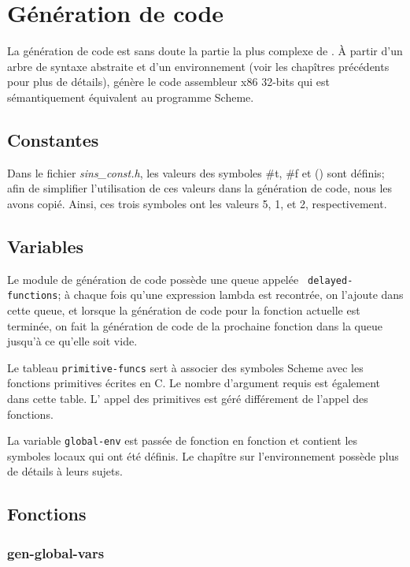 \documentclass[11pt]{report}
\begin{document}
\chapter{Génération de code}

La génération de code est sans doute la partie la plus complexe de
\sins{}.  À partir d'un arbre de syntaxe abstraite et d'un
environnement (voir les chapîtres précédents pour plus de détails),
\sins{} génère le code assembleur x86 32-bits qui est sémantiquement
équivalent au programme Scheme.

\section{Constantes}

Dans le fichier {\it sins_const.h}, les valeurs des symboles \#t,
\#f et () sont définis; afin de simplifier l'utilisation de ces
valeurs dans la génération de code, nous les avons copié.  Ainsi, ces
trois symboles ont les valeurs 5, 1, et 2, respectivement.

\section{Variables}

Le module de génération de code possède une queue appelée {\tt
  delayed-functions}; à chaque fois qu'une expression lambda est
recontrée, on l'ajoute dans cette queue, et lorsque la génération de
code pour la fonction actuelle est terminée, on fait la génération de
code de la prochaine fonction dans la queue jusqu'à ce qu'elle soit
vide.

Le tableau {\tt primitive-funcs} sert à associer des symboles Scheme
avec les fonctions primitives écrites en C.  Le nombre d'argument
requis est également dans cette table.  L' appel des primitives est
géré différement de l'appel des fonctions.

La variable {\tt global-env} est passée de fonction en fonction et
contient les symboles locaux qui ont été définis.  Le chapître sur
l'environnement possède plus de détails à leurs sujets.



\section{Fonctions}

\subsection{gen-global-vars}
\end{document}
